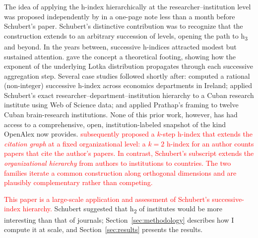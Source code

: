 The idea of applying the h-index hierarchically at the researcher--institution level was proposed independently by \cite{prathap2006} in a one-page note less than a month before Schubert's paper. Schubert's distinctive contribution was to recognize that the construction extends to an arbitrary succession of levels, opening the path to h\textsubscript{3} and beyond. In the years between, successive h-indices attracted modest but sustained attention. \cite{egghe2008} gave the concept a theoretical footing, showing how the exponent of the underlying Lotka distribution propagates through each successive aggregation step. Several case studies followed shortly after: \cite{ruane2008} computed a rational (non-integer) successive h-index across economics departments in Ireland; \cite{arencibia2008} applied Schubert's exact researcher--department--institution hierarchy to a Cuban research institute using Web of Science data; and \cite{arencibiajrousseau2009} applied Prathap's framing to twelve Cuban brain-research institutions. None of this prior work, however, has had access to a comprehensive, open, institution-labeled snapshot of the kind OpenAlex now provides. \textcolor{red}{\cite{yang2023} subsequently proposed a $k$-step h-index that extends the \emph{citation graph} at a fixed organizational level: a $k{=}2$ h-index for an author counts papers that cite the author's papers. In contrast, Schubert's subscript extends the \emph{organizational hierarchy} from authors to institutions to countries. The two families iterate a common construction along orthogonal dimensions and are plausibly complementary rather than competing.}

\textcolor{red}{This paper is a large-scale application and assessment of Schubert's successive-index hierarchy.} Schubert suggested that h\textsubscript{2} of institutes would be more interesting than that of journals; Section~\ref{sec:methodology} describes how I compute it at scale, and Section~\ref{sec:results} presents the results.